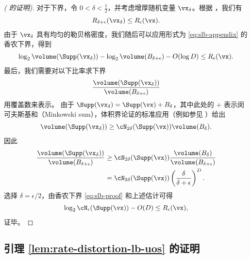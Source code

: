 \documentclass[../../book-main_zh.tex]{subfiles}
\begin{document}
\begin{proof}[( 的证明)]
    对于下界，令 $0 < \delta < \tfrac{1}{2}$，并考虑增厚随机变量 $\vx_{\delta}$。根据 ，我们有
    \begin{equation}
        R_{\delta + \epsilon}(\vx_{\delta})
        \leq
        R_{\epsilon}(\vx).
    \end{equation}
    由于 $\vx_{\delta}$ 具有均匀的勒贝格密度，我们随后可以应用形式为 \eqref{eq:slb-appendix} 的香农下界，得到
    \begin{equation}\label{eq:slb-proof}
        \log_2 \volume(\Supp(\vx_{\delta}))
        - \log_2 \volume(B_{\delta + \epsilon})
        - O(\log D)
        \leq
        R_{\epsilon}(\vx).
    \end{equation}
    最后，我们需要对以下比率求下界
    \begin{equation}
        \frac{
            \volume(\Supp(\vx_{\delta}))
        }
        {
            \volume(B_{\delta + \epsilon})
        }
    \end{equation}
    用覆盖数来表示。
    由于 $\Supp(\vx_{\delta}) = \Supp(\vx) + B_{\delta}$，其中此处的 $+$ 表示闵可夫斯基和（Minkowski sum），体积界论证的标准应用（例如参见 \cite[命题 4.2.12]{Vershynin2018-br}）给出
    \begin{equation}
        \volume(\Supp(\vx_{\delta}))
        \geq
        \cN_{2\delta}(\Supp(\vx))
        \volume(B_{\delta}).
    \end{equation}
    因此
    \begin{align}
        \frac{
            \volume(\Supp(\vx_{\delta}))
        }
        {
            \volume(B_{\delta + \epsilon})
        }
        &\geq
        \cN_{2\delta}(\Supp(\vx))
        \frac{
            \volume(B_{\delta})
        }
        {
            \volume(B_{\delta + \epsilon})
        }
        \\
        &=
        \cN_{2\delta}(\Supp(\vx))
        \left(
            \frac{
                \delta
            }
            {
                \delta + \epsilon
            }
        \right)^D.
    \end{align}
    选择 $\delta = \epsilon / 2$，由香农下界 \eqref{eq:slb-proof} 和上述估计可得
    \begin{equation}
        \log_2 \cN_{\epsilon}(\Supp(\vx))
        - O(D)
        \leq
        R_{\epsilon}(\vx),
    \end{equation}
    证毕。

\end{proof}

\subsection{引理 \ref{lem:rate-distortion-lb-uos} 的证明}\label{sec:app-rate-dist-deferred-proofs}
\end{document}
